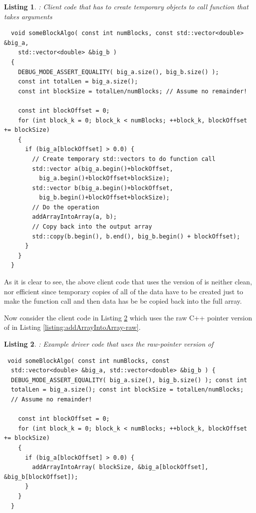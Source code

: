 \documentclass[pdf,ps2pdf,11pt]{SANDreport}
\newtheorem{listing}{Listing}
\begin{document}
{}\begin{listing}: Client code that has to create temporary
{} objects to call function that takes
{} arguments
\label{listing:someBlockAlgo-std-vector}
{\small\begin{verbatim}
  void someBlockAlgo( const int numBlocks, const std::vector<double> &big_a,
    std::vector<double> &big_b )
  {
    DEBUG_MODE_ASSERT_EQUALITY( big_a.size(), big_b.size() );
    const int totalLen = big_a.size();
    const int blockSize = totalLen/numBlocks; // Assume no remainder!
    
    const int blockOffset = 0;
    for (int block_k = 0; block_k < numBlocks; ++block_k, blockOffset += blockSize)
    {
      if (big_a[blockOffset] > 0.0) {
        // Create temporary std::vectors to do function call
        std::vector a(big_a.begin()+blockOffset,
          big_a.begin()+blockOffset+blockSize);
        std::vector b(big_a.begin()+blockOffset,
          big_b.begin()+blockOffset+blockSize);
        // Do the operation
        addArrayIntoArray(a, b);
        // Copy back into the output array
        std::copy(b.begin(), b.end(), big_b.begin() + blockOffset);
      }
    }
  }
\end{verbatim}}
\end{listing}

As it is clear to see, the above client code that uses the
{} version of {} is
neither clean, nor efficient since temporary copies of all of the data
have to be created just to make the function call and then data has be
be copied back into the full array.

Now consider the client code in Listing
{}\ref{listing:someBlockAlgo-std-vector-raw-ptr} which uses the raw C++
pointer version of {} in Listing
{}\ref{listing:addArrayIntoArray-raw}.

{}\begin{listing}: Example driver code that uses the raw-pointer
version of {}
\label{listing:someBlockAlgo-std-vector-raw-ptr}
{\small\begin{verbatim} void someBlockAlgo( const int numBlocks, const
  std::vector<double> &big_a, std::vector<double> &big_b ) {
  DEBUG_MODE_ASSERT_EQUALITY( big_a.size(), big_b.size() ); const int
  totalLen = big_a.size(); const int blockSize = totalLen/numBlocks;
  // Assume no remainder!
    
    const int blockOffset = 0;
    for (int block_k = 0; block_k < numBlocks; ++block_k, blockOffset += blockSize)
    {
      if (big_a[blockOffset] > 0.0) {
        addArrayIntoArray( blockSize, &big_a[blockOffset], &big_b[blockOffset]);
      }
    }
  }
\end{verbatim}}
\end{listing}
\end{document}
